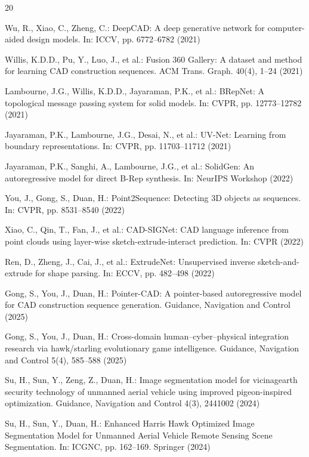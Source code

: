 \documentclass{styles/svproc}
\begin{document}
\begin{thebibliography}{20}

Wu, R., Xiao, C., Zheng, C.: DeepCAD: A deep generative network for computer-aided design models. In: ICCV, pp. 6772--6782 (2021)

Willis, K.D.D., Pu, Y., Luo, J., et al.: Fusion 360 Gallery: A dataset and method for learning CAD construction sequences. ACM Trans. Graph. 40(4), 1--24 (2021)

Lambourne, J.G., Willis, K.D.D., Jayaraman, P.K., et al.: BRepNet: A topological message passing system for solid models. In: CVPR, pp. 12773--12782 (2021)

Jayaraman, P.K., Lambourne, J.G., Desai, N., et al.: UV-Net: Learning from boundary representations. In: CVPR, pp. 11703--11712 (2021)

Jayaraman, P.K., Sanghi, A., Lambourne, J.G., et al.: SolidGen: An autoregressive model for direct B-Rep synthesis. In: NeurIPS Workshop (2022)

You, J., Gong, S., Duan, H.: Point2Sequence: Detecting 3D objects as sequences. In: CVPR, pp. 8531--8540 (2022)

Xiao, C., Qin, T., Fan, J., et al.: CAD-SIGNet: CAD language inference from point clouds using layer-wise sketch-extrude-interact prediction. In: CVPR (2022)

Ren, D., Zheng, J., Cai, J., et al.: ExtrudeNet: Unsupervised inverse sketch-and-extrude for shape parsing. In: ECCV, pp. 482--498 (2022)

Gong, S., You, J., Duan, H.: Pointer-CAD: A pointer-based autoregressive model for CAD construction sequence generation. Guidance, Navigation and Control (2025)

Gong, S., You, J., Duan, H.: Cross-domain human--cyber--physical integration research via hawk/starling evolutionary game intelligence. Guidance, Navigation and Control 5(4), 585--588 (2025)

Su, H., Sun, Y., Zeng, Z., Duan, H.: Image segmentation model for vicinagearth security technology of unmanned aerial vehicle using improved pigeon-inspired optimization. Guidance, Navigation and Control 4(3), 2441002 (2024)

Su, H., Sun, Y., Duan, H.: Enhanced Harris Hawk Optimized Image Segmentation Model for Unmanned Aerial Vehicle Remote Sensing Scene Segmentation. In: ICGNC, pp. 162--169. Springer (2024)


\end{thebibliography}
\end{document}
